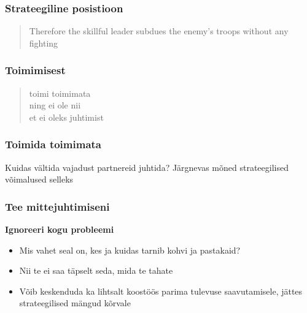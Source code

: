 \begin{frame}[fragile]
  \frametitle{Strateegiline posistioon}
	\begin{center}
		\begin{quote}
			Therefore the skillful leader subdues the enemy's troops without any fighting
		\end{quote}
	\end{center}
	\cite{tzu2013art}
\end{frame}

\begin{frame}[fragile]
  \frametitle{Toimimisest}
	\begin{center}
		\begin{quote}
	toimi toimimata\\
	ning ei ole nii\\
	et ei oleks juhtimist
   		\end{quote}
	\end{center}
\cite{laozi}
\end{frame}

\begin{frame}[fragile]
  \frametitle{Toimida toimimata}
	\begin{center}
			Kuidas vältida vajadust partnereid juhtida?
			\vfill
			Järgnevas mõned strateegilised võimalused selleks
	\end{center}
\end{frame}


\begin{frame}[fragile]
  \frametitle{Tee mittejuhtimiseni}
	\textbf{Ignoreeri kogu probleemi}
	\begin{itemize}
		\item Mis vahet seal on, kes ja kuidas tarnib kohvi ja pastakaid?
		\item Nii te ei saa täpselt seda, mida te tahate
		\item Võib keskenduda ka lihtsalt koostöös parima tulevuse saavutamisele, jättes strateegilised mängud kõrvale
	\end{itemize}
\end{frame}

